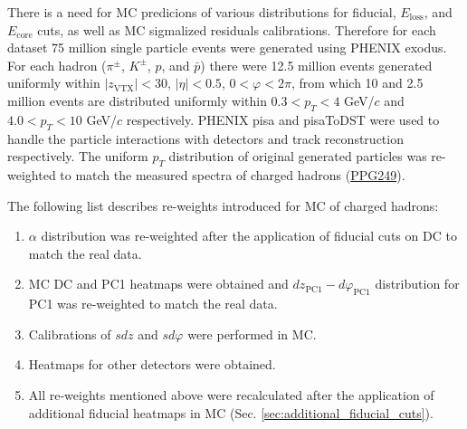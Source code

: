 There is a need for MC predicions of various distributions for fiducial, $E_{\text{loss}}$, and $E_{\text{core}}$ cuts, as well as MC sigmalized residuals calibrations. 
Therefore for each dataset 75 million single particle events were generated using PHENIX exodus. 
For each hadron ($\pi^\pm$, $K^\pm$, $p$, and $\bar{p}$) there were 12.5 million events generated uniformly within $\lvert z_{\text{VTX}}\rvert < 30$, $\lvert\eta\rvert < 0.5$, $0 < \varphi < 2\pi$, from which 10 and 2.5 million events are distributed uniformly within $0.3<p_T<4$ GeV/$c$ and $4.0<p_T<10$ GeV/$c$ respectively.
PHENIX pisa and pisaToDST were used to handle the particle interactions with detectors and track reconstruction respectively.
The uniform $p_T$ distribution of original generated particles was re-weighted to match the measured spectra of charged hadrons (\href{https://arxiv.org/abs/2312.09827}{PPG249}).

The following list describes re-weights introduced for MC of charged hadrons:
\begin{enumerate}
   \item $\alpha$ distribution was re-weighted after the application of fiducial cuts on DC to match the real data.
   \item MC DC and PC1 heatmaps were obtained and $dz_{\text{PC1}}-d\varphi_{\text{PC1}}$ distribution for PC1 was re-weighted to match the real data.
   \item Calibrations of $sdz$ and $sd\varphi$ were performed in MC.
   \item Heatmaps for other detectors were obtained. 
   \item All re-weights mentioned above were recalculated after the application of additional fiducial heatmaps in MC (Sec. \ref{sec:additional_fiducial_cuts}).
\end{enumerate}
